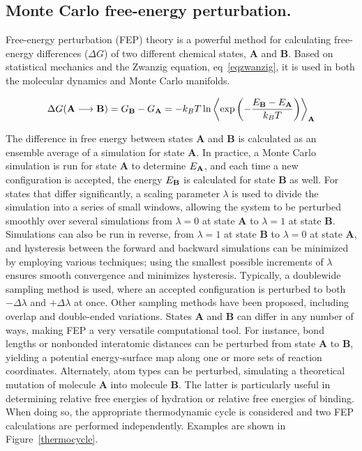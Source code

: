 \documentclass[12pt]{report}
\def\figlab{Figure}\def\figslab{\figlab s}
\def\equlab{eq}\def\equslab{Eqs.}
\newcommand*\eq[1]{\equlab~\ref{#1}}
\newcommand*\fig[1]{\figlab~\ref{#1}}
\begin{document}
\subsection{Monte Carlo free-energy perturbation.}

Free-energy perturbation (FEP) theory is a powerful method for calculating free-energy differences ($\Delta G$) of two different chemical states, \textbf{A} and \textbf{B}. Based on statistical mechanics and the Zwanzig equation,\cite{zwanzig} \eq{eqzwanzig}, it is used in both the molecular dynamics and Monte Carlo manifolds.
\vspace*{0.01cm}

\vspace*{-0.4cm}
\begin{equation}
\label{eqzwanzig}
\Delta G(\textrm{\textbf{A}} \longrightarrow \textrm{\textbf{B}}) = G_\textrm{\textbf{B}} - G_\textrm{\textbf{A}} = -k_B T \ln \left\langle \textrm{exp} \left(- \frac{E_\textrm{\textbf{B}} - E_\textrm{\textbf{A}}}{k_B T} \right) \right\rangle_\textrm{\textbf{A}}
\end{equation}
\vspace*{-0.5cm}

The difference in free energy between states \textbf{A} and \textbf{B} is calculated as an ensemble average of a simulation for state \textbf{A}. In practice, a Monte Carlo simulation is run for state \textbf{A} to determine $E_{\textrm{\textbf{A}}}$, and each time a new configuration is accepted, the energy $E_{\textrm{\textbf{B}}}$ is calculated for state \textbf{B} as well. For states that differ significantly, a scaling parameter $\lambda$ is used to divide the simulation into a series of small windows, allowing the system to be perturbed smoothly over several simulations from $\lambda = 0$ at state \textbf{A} to $\lambda = 1$ at state \textbf{B}. Simulations can also be run in reverse, from $\lambda = 1$ at state \textbf{B} to $\lambda = 0$ at state \textbf{A}, and hysteresis between the forward and backward simulations can be minimized by employing various techniques; using the smallest possible increments of $\lambda$ ensures smooth convergence and minimizes hysteresis. Typically, a doublewide sampling method is used, where an accepted configuration is perturbed to both $-\Delta\lambda$ and $+\Delta\lambda$ at once. Other sampling methods have been proposed, including overlap and double-ended variations.\cite{thomas} States \textbf{A} and \textbf{B} can differ in any number of ways, making FEP a very versatile computational tool. For instance, bond lengths or nonbonded interatomic distances can be perturbed from state \textbf{A} to \textbf{B}, yielding a potential energy-surface map along one or more sets of reaction coordinates. Alternately, atom types can be perturbed, simulating a theoretical mutation of molecule \textbf{A} into molecule \textbf{B}. The latter is particularly useful in determining relative free energies of hydration or relative free energies of binding. When doing so, the appropriate thermodynamic cycle is considered and two FEP calculations are performed independently. Examples are shown in \fig{thermocycle}.
\end{document}
